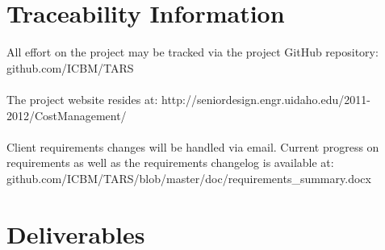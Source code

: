 \documentclass[letterpaper]{article}
\begin{document}
\section{Traceability Information}
All effort on the project may be tracked via the project GitHub repository: github.com/ICBM/TARS\\
\\
The project website resides at: http://seniordesign.engr.uidaho.edu/2011-2012/CostManagement/\\
\\ 
Client requirements changes will be handled via email. Current progress on requirements as well as the requirements changelog is available at: github.com/ICBM/TARS/blob/master/doc/requirements\_summary.docx\\

\section{Deliverables}
\end{document}
